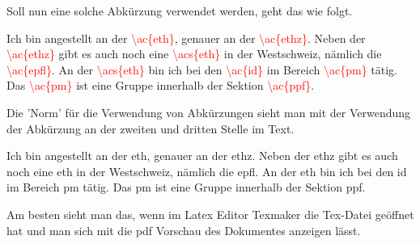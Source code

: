 Soll nun eine solche Abkürzung verwendet werden, geht das wie folgt.

\begin{tcolorbox}[width=\textwidth,colback={light-gray},title={Latex-Text},colbacktitle=gray,coltitle=white]

Ich bin angestellt an der \textcolor{red}{\textbackslash{ac\{eth\}}}, genauer an der \textcolor{red}{\textbackslash{ac\{ethz\}}}. Neben der \textcolor{red}{\textbackslash{ac\{ethz\}}} gibt es auch noch eine \textcolor{red}{\textbackslash{acs\{eth\}}} in der Westschweiz, nämlich die \textcolor{red}{\textbackslash{ac\{epfl\}}}. An der \textcolor{red}{\textbackslash{acs\{eth\}}} bin ich bei den \textcolor{red}{\textbackslash{ac\{id\}}} im Bereich \textcolor{red}{\textbackslash{ac\{pm\}}} tätig. Das \textcolor{red}{\textbackslash{ac\{pm\}}} ist eine Gruppe innerhalb der Sektion \textcolor{red}{\textbackslash{ac\{ppf\}}}.

\end{tcolorbox}


Die 'Norm' für die Verwendung von Abkürzungen sieht man mit der Verwendung der Abkürzung \textcolor{red}{} an der zweiten und dritten Stelle im Text.


\begin{tcolorbox}[width=\textwidth,colback={light-gray},title={Print-Text},colbacktitle=gray,coltitle=white]

Ich bin angestellt an der \ac{eth}, genauer an der \ac{ethz}. Neben der \ac{ethz} gibt es auch noch eine \acs{eth} in der Westschweiz, nämlich die \ac{epfl}. An der \acs{eth} bin ich bei den \ac{id} im Bereich \ac{pm} tätig. Das \ac{pm} ist eine Gruppe innerhalb der Sektion \ac{ppf}.

\end{tcolorbox}

Am besten sieht man das, wenn im Latex Editor Texmaker die Tex-Datei geöffnet hat und man sich mit  die pdf Vorschau des Dokumentes anzeigen lässt.
